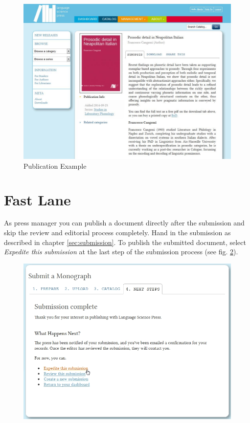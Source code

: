 \begin{figure}[h] \centering
\includegraphics[width=1\textwidth]{./img/publication.jpg} \caption{Publication Example}
\label{fig:publication}
\end{figure}

\newpage
\section{Fast Lane}
As press manager you can publish a document directly after the submission and skip the review and editorial process completely. Hand in the submission as described in chapter \ref{sec:submission}. To publish the submitted document, select \textit{Expedite this submission} at the last step of the submission process (see fig. \ref{fig:fastLane}).

\begin{figure}[h] \centering
\includegraphics[width=1\textwidth]{./img/fastLane.jpg}
\label{fig:fastLane}
\end{figure}

